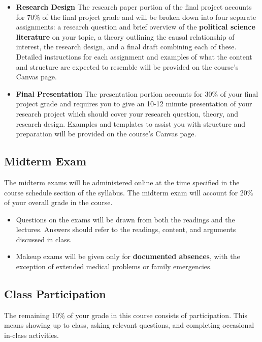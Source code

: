 \documentclass[12pt,]{article}
\begin{document}
\begin{itemize}
\item
  \textbf{Research Design} The research paper portion of the final
  project accounts for 70\% of the final project grade and will be
  broken down into four separate assignments: a research question and
  brief overview of the \textbf{political science literature} on your
  topic, a theory outlining the causal relationship of interest, the
  research design, and a final draft combining each of these. Detailed
  instructions for each assignment and examples of what the content and
  structure are expected to resemble will be provided on the course's
  Canvas page.
\item
  \textbf{Final Presentation} The presentation portion accounts for 30\%
  of your final project grade and requires you to give an 10-12 minute
  presentation of your research project which should cover your research
  question, theory, and research design. Examples and templates to
  assist you with structure and preparation will be provided on the
  course's Canvas page.
\end{itemize}

\hypertarget{midterm-exam}{%
\subsection{Midterm Exam}\label{midterm-exam}}

\noindent The midterm exams will be administered online at the time
specified in the course schedule section of the syllabus. The midterm
exam will account for 20\% of your overall grade in the course.

\begin{itemize}
\item
  Questions on the exams will be drawn from both the readings and the
  lectures. Answers should refer to the readings, content, and arguments
  discussed in class.
\item
  Makeup exams will be given only for \textbf{documented absences}, with
  the exception of extended medical problems or family emergencies.
\end{itemize}

\hypertarget{class-participation}{%
\subsection{Class Participation}\label{class-participation}}

\noindent The remaining 10\% of your grade in this course consists of
participation. This means showing up to class, asking relevant
questions, and completing occasional in-class activities.
\end{document}
